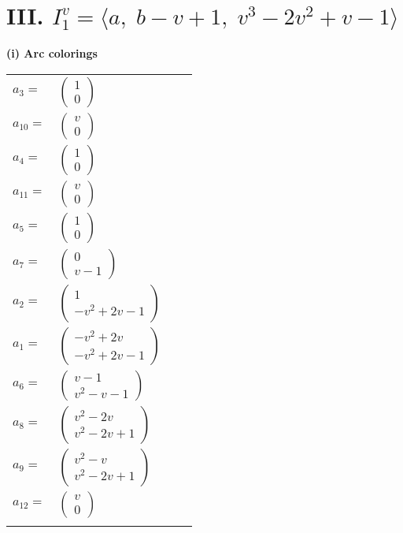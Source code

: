 \documentclass[1p]{elsarticle_modified}
\theoremstyle{definition}
\begin{document}
\centering \section*{III. $I^v_{1}= \langle a,\;b- v+1,\;v^3-2 v^2+v-1 \rangle$}
\flushleft \textbf{(i) Arc colorings}\\
\begin{tabular}{m{7pt} m{180pt} m{7pt} m{180pt} }
\flushright $a_{3}=$&$\begin{pmatrix}1\\0\end{pmatrix}$ \\
\flushright $a_{10}=$&$\begin{pmatrix}v\\0\end{pmatrix}$ \\
\flushright $a_{4}=$&$\begin{pmatrix}1\\0\end{pmatrix}$ \\
\flushright $a_{11}=$&$\begin{pmatrix}v\\0\end{pmatrix}$ \\
\flushright $a_{5}=$&$\begin{pmatrix}1\\0\end{pmatrix}$ \\
\flushright $a_{7}=$&$\begin{pmatrix}0\\v-1\end{pmatrix}$ \\
\flushright $a_{2}=$&$\begin{pmatrix}1\\- v^2+2 v-1\end{pmatrix}$ \\
\flushright $a_{1}=$&$\begin{pmatrix}- v^2+2 v\\- v^2+2 v-1\end{pmatrix}$ \\
\flushright $a_{6}=$&$\begin{pmatrix}v-1\\v^2- v-1\end{pmatrix}$ \\
\flushright $a_{8}=$&$\begin{pmatrix}v^2-2 v\\v^2-2 v+1\end{pmatrix}$ \\
\flushright $a_{9}=$&$\begin{pmatrix}v^2- v\\v^2-2 v+1\end{pmatrix}$ \\
\flushright $a_{12}=$&$\begin{pmatrix}v\\0\end{pmatrix}$\\&\end{tabular}
\end{document}
